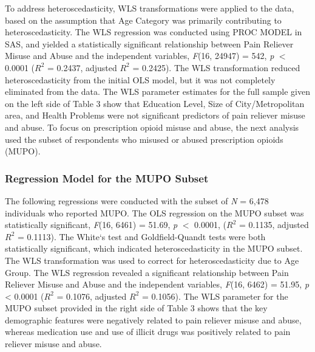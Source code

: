 \documentclass[sigconf]{acmart}
\begin{document}
To address heteroscedasticity, WLS transformations were applied to the 
data, based on the assumption that Age Category was primarily contributing to 
heteroscedasticity. The WLS regression was conducted using PROC MODEL in SAS, 
and yielded a statistically significant relationship between Pain Reliever 
Misuse and Abuse and the independent variables, \textit{F}(16, 24947) = 542, 
\textit{p} $<$ 0.0001 ($R^2$ = 0.2437, adjusted $R^2$ = 0.2425). The WLS 
transformation reduced heteroscedasticity from the initial OLS model, but it 
was not completely eliminated from the data. The WLS parameter estimates for 
the full sample given on the left side of Table 3 show that Education Level, 
Size of City/Metropolitan area, and Health Problems were not significant 
predictors of pain reliever misuse and abuse. To focus on prescription opioid 
misuse and abuse, the next analysis used the subset of respondents who
misused or abused prescription opioids (MUPO). 


\subsubsection{Regression Model for the MUPO Subset} 

The following regressions were conducted with the subset of \textit{N} = 6,478 
individuals who reported MUPO. The OLS regression on the MUPO subset was 
statistically significant, \textit{F}(16, 6461) = 51.69, \textit{p} $<$ 0.0001, 
($R^2$ = 0.1135, adjusted $R^2$ = 0.1113). The White`s test and Goldfield-Quandt 
tests were both statistically significant, which indicated heteroscedasticity 
in the MUPO subset. The WLS transformation was used to correct for 
heteroscedasticity due to Age Group. The WLS regression revealed a significant 
relationship between Pain Reliever Misuse and Abuse and the independent 
variables, \textit{F}(16, 6462) = 51.95, \textit{p} < 0.0001 ($R^2$ = 0.1076, 
adjusted $R^2$ = 0.1056). The WLS parameter for the MUPO subset provided in 
the right side of Table 3 shows that the key demographic features were 
negatively related to pain reliever misuse and abuse, whereas medication 
use and use of illicit drugs was positively related to pain reliever misuse 
and abuse. 
\end{document}
